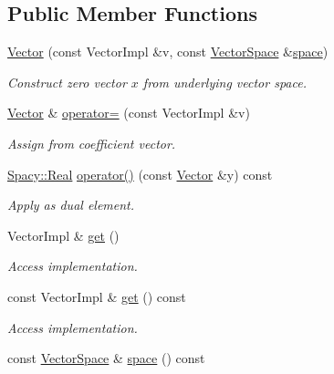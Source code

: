 \subsection*{Public Member Functions}
\begin{DoxyCompactItemize}
\item 
\hyperlink{classSpacy_1_1Generic_1_1Vector_a35622c4a7a184c2d6ff951bbde6a871c}{Vector} (const Vector\+Impl \&v, const \hyperlink{classSpacy_1_1VectorSpace}{Vector\+Space} \&\hyperlink{classSpacy_1_1VectorBase_aa999dbf9d679d895dfe04c10fbf9f5e9}{space})
\begin{DoxyCompactList}\small\item\em Construct zero vector $x$ from underlying vector space. \end{DoxyCompactList}\item 
\hyperlink{classSpacy_1_1Generic_1_1Vector}{Vector} \& \hyperlink{classSpacy_1_1Generic_1_1Vector_acec9492900de215a4e3d4b16129fbadd}{operator=} (const Vector\+Impl \&v)
\begin{DoxyCompactList}\small\item\em Assign from coefficient vector. \end{DoxyCompactList}\item 
\hyperlink{classSpacy_1_1Real}{Spacy\+::\+Real} \hyperlink{classSpacy_1_1Generic_1_1Vector_acf676aac17118e0b3b7d6b08f026d641}{operator()} (const \hyperlink{classSpacy_1_1Generic_1_1Vector}{Vector} \&y) const 
\begin{DoxyCompactList}\small\item\em Apply as dual element. \end{DoxyCompactList}\item 
Vector\+Impl \& \hyperlink{classSpacy_1_1Mixin_1_1Get_aaa3afedcb9b9e943f81d1686b70417db}{get} ()\hypertarget{classSpacy_1_1Mixin_1_1Get_aaa3afedcb9b9e943f81d1686b70417db}{}\label{classSpacy_1_1Mixin_1_1Get_aaa3afedcb9b9e943f81d1686b70417db}

\begin{DoxyCompactList}\small\item\em Access implementation. \end{DoxyCompactList}\item 
const Vector\+Impl \& \hyperlink{classSpacy_1_1Mixin_1_1Get_ab00e550fb3ac8208d0a25e17e705a9fc}{get} () const\hypertarget{classSpacy_1_1Mixin_1_1Get_ab00e550fb3ac8208d0a25e17e705a9fc}{}\label{classSpacy_1_1Mixin_1_1Get_ab00e550fb3ac8208d0a25e17e705a9fc}

\begin{DoxyCompactList}\small\item\em Access implementation. \end{DoxyCompactList}\item 
const \hyperlink{classSpacy_1_1VectorSpace}{Vector\+Space} \& \hyperlink{classSpacy_1_1VectorBase_aa999dbf9d679d895dfe04c10fbf9f5e9}{space} () const \hypertarget{classSpacy_1_1VectorBase_aa999dbf9d679d895dfe04c10fbf9f5e9}{}\label{classSpacy_1_1VectorBase_aa999dbf9d679d895dfe04c10fbf9f5e9}


\end{DoxyCompactItemize}
